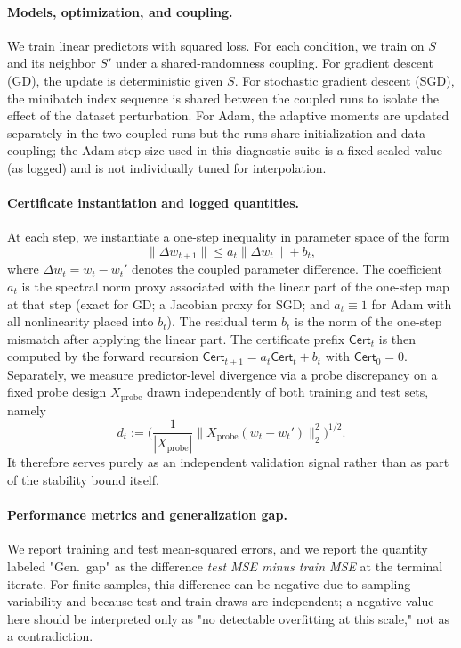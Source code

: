 \documentclass{article}
\numberwithin{equation}{section}
\begin{document}
\paragraph{Models, optimization, and coupling.}
We train linear predictors with squared loss. For each condition, we train on $S$ and its neighbor $S'$ under a shared-randomness coupling. For gradient descent (GD), the update is deterministic given $S$. For stochastic gradient descent (SGD), the minibatch index sequence is shared between the coupled runs to isolate the effect of the dataset perturbation. For Adam, the adaptive moments are updated separately in the two coupled runs but the runs share initialization and data coupling; the Adam step size used in this diagnostic suite is a fixed scaled value (as logged) and is not individually tuned for interpolation.

\paragraph{Certificate instantiation and logged quantities.}
At each step, we instantiate a one-step inequality in parameter space of the form
\[
\|\Delta w_{t+1}\| \le a_t \|\Delta w_t\| + b_t,
\]
where $\Delta w_t = w_t - w_t'$ denotes the coupled parameter difference. The coefficient $a_t$ is the spectral norm proxy associated with the linear part of the one-step map at that step (exact for GD; a Jacobian proxy for SGD; and $a_t \equiv 1$ for Adam with all nonlinearity placed into $b_t$). The residual term $b_t$ is the norm of the one-step mismatch after applying the linear part. The certificate prefix $\mathsf{Cert}_t$ is then computed by the forward recursion $\mathsf{Cert}_{t+1}=a_t \mathsf{Cert}_t + b_t$ with $\mathsf{Cert}_0=0$. Separately, we measure predictor-level divergence via a probe discrepancy on a fixed probe design $X_{\mathrm{probe}}$ drawn independently of both training and test sets, namely
\[
d_t := \Big(\frac{1}{|X_{\mathrm{probe}}|}\|X_{\mathrm{probe}}(w_t-w_t')\|_2^2\Big)^{1/2}.
\]
It therefore serves purely as an independent validation signal rather than as part of the stability bound itself.

\paragraph{Performance metrics and generalization gap.}
We report training and test mean-squared errors, and we report the quantity labeled "Gen.\ gap" as the difference \emph{test MSE minus train MSE} at the terminal iterate. For finite samples, this difference can be negative due to sampling variability and because test and train draws are independent; a negative value here should be interpreted only as "no detectable overfitting at this scale," not as a contradiction.
\end{document}
